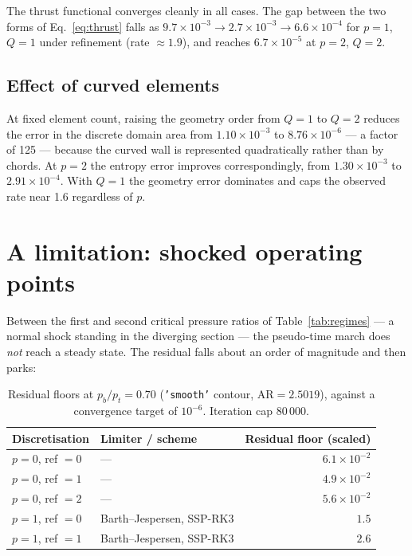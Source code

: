 \documentclass[11pt,a4paper]{article}
\newcommand{\code}[1]{\texttt{#1}}
\begin{document}
The thrust functional converges cleanly in all cases.  The gap between the two
forms of Eq.~\eqref{eq:thrust} falls as
$9.7\times10^{-3} \to 2.7\times10^{-3} \to 6.6\times10^{-4}$ for $p=1$, $Q=1$
under refinement (rate $\approx 1.9$), and reaches $6.7\times10^{-5}$ at $p=2$,
$Q=2$.

\subsection{Effect of curved elements}

At fixed element count, raising the geometry order from $Q = 1$ to $Q = 2$ reduces
the error in the discrete domain area from $1.10\times10^{-3}$ to
$8.76\times10^{-6}$ --- a factor of 125 --- because the curved wall is
represented quadratically rather than by chords.  At $p = 2$ the entropy error
improves correspondingly, from $1.30\times10^{-3}$ to $2.91\times10^{-4}$.  With
$Q = 1$ the geometry error dominates and caps the observed rate near 1.6
regardless of $p$.

\section{A limitation: shocked operating points}
\label{sec:limitation}

Between the first and second critical pressure ratios of
Table~\ref{tab:regimes} --- a normal shock standing in the diverging section ---
the pseudo-time march does \emph{not} reach a steady state.  The residual falls
about an order of magnitude and then parks:

\begin{table}[H]
  \centering
  \small
  \begin{tabular}{llr}
    \toprule
    Discretisation & Limiter / scheme & Residual floor (scaled) \\
    \midrule
    $p=0$, ref $=0$ & ---                          & $6.1\times10^{-2}$ \\
    $p=0$, ref $=1$ & ---                          & $4.9\times10^{-2}$ \\
    $p=0$, ref $=2$ & ---                          & $5.6\times10^{-2}$ \\
    $p=1$, ref $=0$ & Barth--Jespersen, SSP-RK3    & $1.5$ \\
    $p=1$, ref $=1$ & Barth--Jespersen, SSP-RK3    & $2.6$ \\
    \bottomrule
  \end{tabular}
  \caption{Residual floors at $p_b/p_t = 0.70$ (\code{'smooth'} contour,
    $\mathrm{AR} = 2.5019$), against a convergence target of $10^{-6}$.
    Iteration cap 80\,000.}
  \label{tab:shockfloor}
\end{table}
\end{document}
